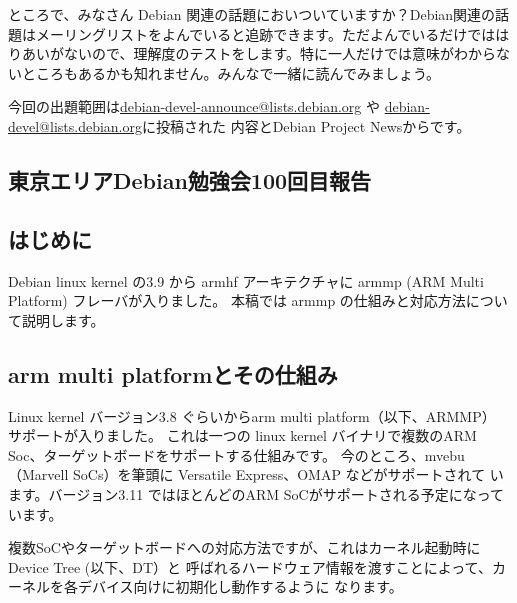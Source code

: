 \documentclass[mingoth,a4paper]{jsarticle}
\begin{document}

ところで、みなさん Debian 関連の話題においついていますか？Debian関連の話
題はメーリングリストをよんでいると追跡できます。ただよんでいるだけではは
りあいがないので、理解度のテストをします。特に一人だけでは意味がわからな
いところもあるかも知れません。みんなで一緒に読んでみましょう。

今回の出題範囲は\url{debian-devel-announce@lists.debian.org} や \url{debian-devel@lists.debian.org}に投稿された
内容とDebian Project Newsからです。

\begin{multicols}{2}

\end{multicols}

\subsection{東京エリアDebian勉強会100回目報告}



\subsection{はじめに}
Debian linux kernel の3.9 から armhf アーキテクチャに armmp (ARM Multi Platform) 
フレーバが入りました。
本稿では armmp の仕組みと対応方法について説明します。

\subsection{arm multi platformとその仕組み}

Linux kernel バージョン3.8 ぐらいからarm multi platform（以下、ARMMP） サポートが入りました。
これは一つの linux kernel バイナリで複数のARM Soc、ターゲットボードをサポートする仕組みです。
今のところ、mvebu （Marvell SoCs）を筆頭に Versatile Express、OMAP などがサポートされて
います。バージョン3.11 ではほとんどのARM SoCがサポートされる予定になっています。

複数SoCやターゲットボードへの対応方法ですが、これはカーネル起動時にDevice Tree (以下、DT）と
呼ばれるハードウェア情報を渡すことによって、カーネルを各デバイス向けに初期化し動作するように
なります。
\end{document}
